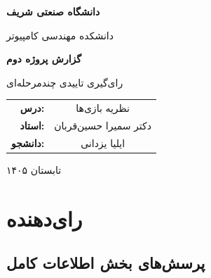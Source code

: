 \documentclass[12pt]{article}
\begin{document}
\begin{titlepage}

\centering

\vspace*{2cm}

{\Large\textbf{دانشگاه صنعتی شریف}}

\vspace{0.5cm}

{\large دانشکده مهندسی کامپیوتر}

\vspace{2cm}

{\Huge\bfseries گزارش پروژه دوم}

\vspace{0.5cm}

{\Huge رای‌گیری تاییدی چندمرحله‌ای}

\vspace{2.5cm}

{\large
\begin{tabular}{rc}
    \textbf{درس:} & نظریه بازی‌ها\\[0.3cm]
    \textbf{استاد:} & دکتر سمیرا حسین‌قربان\\[0.3cm]
    \textbf{دانشجو:} & ایلیا یزدانی
\end{tabular}
}

\vfill

{\large تابستان ۱۴۰۵}

\end{titlepage}

\tableofcontents

\newpage

\begin{abstract}
    در این گزارش به پرسش‌های مطرح شده، در پروژه داده شده به طور کامل پاسخ داده‌ام.
\end{abstract}

\section{رای‌دهنده}

\subsection{پرسش‌های بخش اطلاعات کامل}
\end{document}
